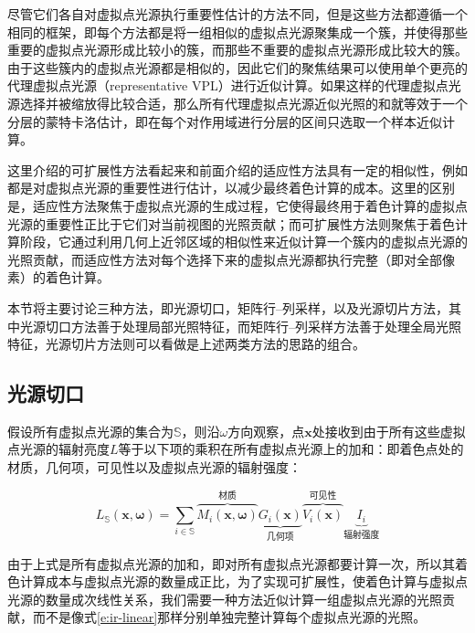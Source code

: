 尽管它们各自对虚拟点光源执行重要性估计的方法不同，但是这些方法都遵循一个相同的框架，即每个方法都是将一组相似的虚拟点光源聚集成一个簇，并使得那些重要的虚拟点光源形成比较小的簇，而那些不重要的虚拟点光源形成比较大的簇。由于这些簇内的虚拟点光源都是相似的，因此它们的聚焦结果可以使用单个更亮的代理虚拟点光源（representative VPL）进行近似计算。如果这样的代理虚拟点光源选择并被缩放得比较合适，那么所有代理虚拟点光源近似光照的和就等效于一个分层的蒙特卡洛估计，即在每个对作用域进行分层的区间只选取一个样本近似计算。

\begin{myshaded}
	这里介绍的可扩展性方法看起来和前面介绍的适应性方法具有一定的相似性，例如都是对虚拟点光源的重要性进行估计，以减少最终着色计算的成本。这里的区别是，适应性方法聚焦于虚拟点光源的生成过程，它使得最终用于着色计算的虚拟点光源的重要性正比于它们对当前视图的光照贡献；而可扩展性方法则聚焦于着色计算阶段，它通过利用几何上近邻区域的相似性来近似计算一个簇内的虚拟点光源的光照贡献，而适应性方法对每个选择下来的虚拟点光源都执行完整（即对全部像素）的着色计算。
\end{myshaded}

本节将主要讨论三种方法，即光源切口，矩阵行--列采样，以及光源切片方法，其中光源切口方法善于处理局部光照特征，而矩阵行--列采样方法善于处理全局光照特征，光源切片方法则可以看做是上述两类方法的思路的组合。





\subsection{光源切口}
假设所有虚拟点光源的集合为$\mathds{S}$，则沿$\omega$方向观察，点$\mathbf{x}$处接收到由于所有这些虚拟点光源的辐射亮度$L$等于以下项的乘积在所有虚拟点光源上的加和：即着色点处的材质，几何项，可见性以及虚拟点光源的辐射强度：

\begin{equation}\label{e:ir-linear}
	L_{\mathds{S}}(\mathbf{x},\mathbf{\omega})=\sum_{i\in\mathds{S}}\overbrace{M_i(\mathbf{x},\mathbf{\omega})}^{\text{材质}}\underbrace{G_i(\mathbf{x})}_{\text{几何项}}\overbrace{V_i(\mathbf{x})}^{\text{可见性}}\underbrace{I_i}_{\text{辐射强度}}
\end{equation}

\noindent 由于上式是所有虚拟点光源的加和，即对所有虚拟点光源都要计算一次，所以其着色计算成本与虚拟点光源的数量成正比，为了实现可扩展性，使着色计算与虚拟点光源的数量成次线性关系，我们需要一种方法近似计算一组虚拟点光源的光照贡献，而不是像式\ref{e:ir-linear}那样分别单独完整计算每个虚拟点光源的光照。

